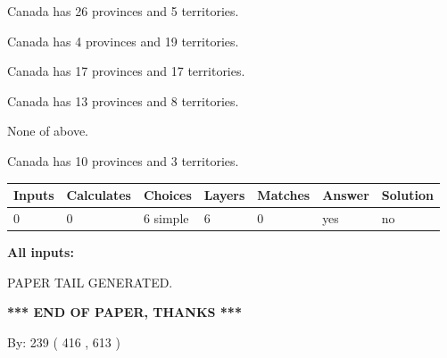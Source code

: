 \documentclass[12pt]{article}
\begin{document}
 
Canada has  26 provinces and  5 territories.
 
 
Canada has   4 provinces and  19 territories.
 
 
Canada has  17 provinces and  17 territories.
 
 
Canada has  13 provinces and  8 territories.
 
 
 None of above.
 
 
\noindent{}
 
 
Canada has 10  provinces and 3 territories.
 
 
\noindent{}
 
 
   
   
   
   
\noindent\begin{tabular}{|l|l|l|l|l|l|l|}
 \hline
Inputs & Calculates & Choices & Layers & Matches & Answer & Solution \\ \hline
 0  & 
 0  & 
 6
  simple  
  & 
 6  & 
 0  & 
  yes & 
  no 
  \\ \hline
 \end{tabular}
   
   
   
   
\noindent{}
   
   
   
   
\noindent\vspace{0.1in}\hspace{-0.08in} {\textbf{\Large{All inputs: }}}
   
   
   
   
   
   
 \vspace{0.2in}
 
   
   
\vspace{2.0in} PAPER TAIL GENERATED.
   
   
   
   
\vspace{1.0in} 
{\textbf{\large{ *** END OF PAPER, THANKS *** }}} 
   
   
\hspace{1.0in} By: 
 239 ( 416 ,  613 )
   
\end{document}
